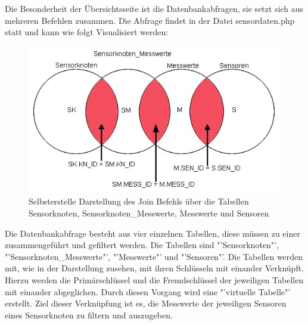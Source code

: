Die Besonderheit der Übersichtsseite ist die Datenbankabfragen, sie setzt sich aus mehreren Befehlen zusammen. Die Abfrage findet in der Datei sensordaten.php statt und kann wie folgt Visualisiert werden:
\begin{figure}[htp]
	\includegraphics[width=\textwidth]{Bilder/Kapitel4/uebersichtjoin.jpg}
	\caption[Mengendarstellung der Übersichtsseite]{Selbsterstelle Darstellung des Join Befehls über die Tabellen Sensorknoten, Sensorknoten\_Messwerte, Messwerte und Sensoren}
	\label{fig:Kapitel4/uebersichtjoin.jpg}
\end{figure}
Die Datenbankabfrage besteht aus vier einzelnen Tabellen, diese müssen zu einer zusammengeführt und gefiltert werden. Die Tabellen sind "'Sensorknoten"', "'Sensorknoten\_Messwerte"', "'Messwerte"' und "'Sensoren"'. Die Tabellen werden mit, wie in der Darstellung zusehen, mit ihren Schlüsseln mit einander Verknüpft. Hierzu werden die Primärschlüssel und die Fremdschlüssel der jeweiligen Tabellen mit einander abgeglichen. Durch diesen Vorgang wird eine "'virtuelle Tabelle"' erstellt. Ziel dieser Verknüpfung ist es, die Messwerte der jeweiligen Sensoren eines Sensorknoten zu filtern und auszugeben.


